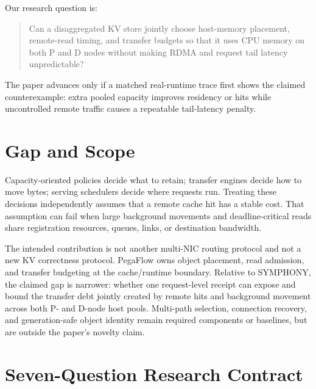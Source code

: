 \documentclass[10pt]{article}
\begin{document}
Our research question is:

\begin{quote}
Can a disaggregated KV store jointly choose host-memory placement, remote-read
timing, and transfer budgets so that it uses CPU memory on both P and D nodes
without making RDMA and request tail latency unpredictable?
\end{quote}

The paper advances only if a matched real-runtime trace first shows the claimed
counterexample: extra pooled capacity improves residency or hits while
uncontrolled remote traffic causes a repeatable tail-latency penalty.

\section{Gap and Scope}

Capacity-oriented policies decide what to retain; transfer engines decide how
to move bytes; serving schedulers decide where requests run. Treating these
decisions independently assumes that a remote cache hit has a stable cost.
That assumption can fail when large background movements and deadline-critical
reads share registration resources, queues, links, or destination bandwidth.

The intended contribution is not another multi-NIC routing protocol and not a
new KV correctness protocol. PegaFlow owns object placement, read admission,
and transfer budgeting at the cache/runtime boundary. Relative to SYMPHONY, the
claimed gap is narrower: whether one request-level receipt can expose and bound
the transfer debt jointly created by remote hits and background movement across
both P- and D-node host pools. Multi-path selection, connection recovery, and
generation-safe object identity remain required
components or baselines, but are outside the paper's novelty claim.

\section{Seven-Question Research Contract}
\end{document}
